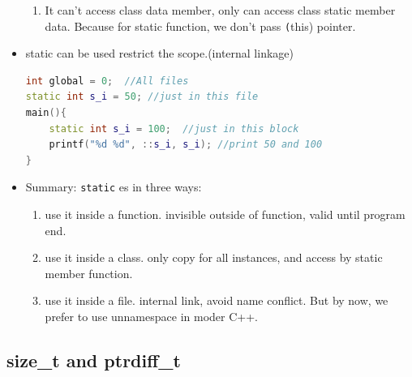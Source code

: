 \documentclass[a4paper,11pt,twoside]{book}
\begin{document}
\begin{itemize}
\begin{enumerate}
		\item It can't access class data member, only can access class static member data. Because for static function, we don't pass \texttt(this) pointer.
	\end{enumerate}
	
	\item static can be used restrict the scope.(internal linkage)
\begin{lstlisting}[frame=single, language=c++]
int global = 0;  //All files
static int s_i = 50; //just in this file
main(){
	static int s_i = 100;  //just in this block
	printf("%d %d", ::s_i, s_i); //print 50 and 100
}
\end{lstlisting}
	
	\item Summary: \texttt{static} es in three ways:
	\begin{enumerate}
		\item use it inside a function. invisible outside of function, valid until program end.
		
		\item use it inside a class. only copy for all instances, and access by static member function.
		
		\item use it inside a file. internal link, avoid name conflict. But by now, we prefer to use unnamespace in moder C++.
	\end{enumerate}
\end{itemize}

\subsection{size\_t and ptrdiff\_t}
\end{document}
